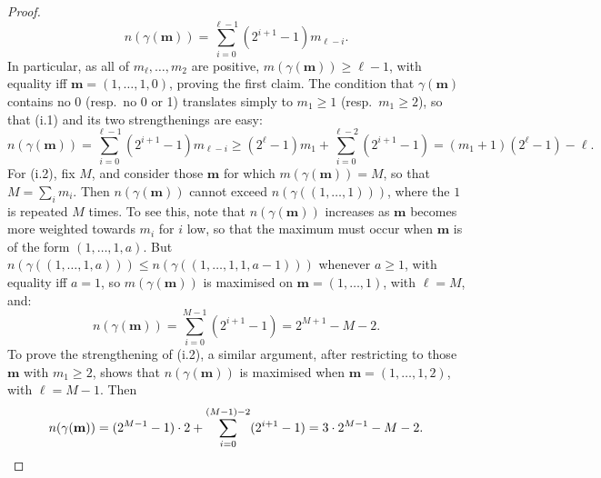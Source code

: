 \documentclass[10pt]{article}
\newcommand{\minDim}{m}
\begin{document}
\begin{KoszulSequenceCombinatorics}
\begin{proof}
\[n(\gamma(\textbf{m}))=\sum_{i=0}^{\ell-1}\left(2^{i+1}-1\right)m_{\ell-i}.\]
In particular, as all of $m_\ell,\ldots,m_2$ are positive, $\minDim(\gamma(\textbf{m}))\geq\ell-1$, with equality iff $\textbf{m}=(1,\ldots,1,0)$, proving the first claim.
The condition that $\gamma(\textbf{m})$ contains no 0 (resp.\ no 0 or 1) translates simply to $m_1\geq1$ (resp.\ $m_1\geq2$), so that \textup{(i.1)} and its two strengthenings are easy:
\[n(\gamma(\textbf{m}))=\sum_{i=0}^{\ell-1}\left(2^{i+1}-1\right)m_{\ell-i}\geq(2^{\ell}-1)m_1+ \sum_{i=0}^{\ell-2}\left(2^{i+1}-1\right)
=(m_1+1)(2^{\ell}-1)-\ell.\]
For \textup{(i.2)}, fix $M$, and consider those $\textbf{m}$ for which $\minDim(\gamma(\textbf{m}))=M$, so that $M=\sum_im_i$. Then $n(\gamma(\textbf{m}))$ cannot exceed $n(\gamma((1,\ldots,1)))$, where the $1$ is repeated $M$ times. To see this, note that $n(\gamma(\textbf{m}))$ increases as $\textbf{m}$ becomes more weighted towards $m_i$ for $i$ low, so that the maximum must occur when $\textbf{m}$ is of the form $(1,\ldots,1,a)$. But $n(\gamma((1,\ldots,1,a)))\leq n(\gamma((1,\ldots,1,1,a-1)))$ whenever $a\geq1$, with equality iff $a=1$, so $\minDim(\gamma(\textbf{m}))$ is maximised on $\textbf{m}=(1,\ldots,1)$, with $\ell=M$, and:
\[n(\gamma(\textbf{m}))=\sum_{i=0}^{M-1}(2^{i+1}-1)=2^{M+1}-M-2.\]
To prove the strengthening of \textup{(i.2)}, a similar argument, after restricting to those $\textbf{m}$ with $m_1\geq2$, shows that $n(\gamma(\textbf{m}))$ is maximised when $\textbf{m}=(1,\ldots,1,2)$, with $\ell=M-1$. Then
\[n(\gamma(\textbf{m}))=(2^{M-1}-1)\cdot2+\sum_{i=0}^{(M-1)-2}(2^{i+1}-1)=3\cdot2^{M-1}-M-2.\qedhere\]
\end{proof}
%

\end{KoszulSequenceCombinatorics}
\end{document}
